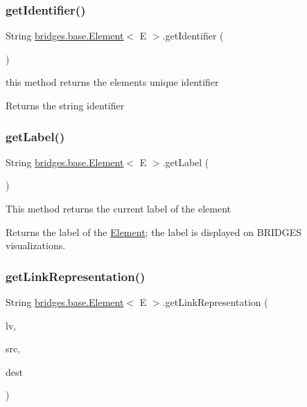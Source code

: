 \subsubsection{\texorpdfstring{getIdentifier()}{getIdentifier()}}
{\footnotesize\ttfamily String \mbox{\hyperlink{classbridges_1_1base_1_1_element}{bridges.\+base.\+Element}}$<$ E $>$.get\+Identifier (\begin{DoxyParamCaption}{ }\end{DoxyParamCaption})}

this method returns the element\textquotesingle{}s unique identifier

\begin{DoxyReturn}{Returns}
the string identifier 
\end{DoxyReturn}
\mbox{\label{classbridges_1_1base_1_1_element_a5c831a0238de487765f6021a887f1542}} 
\subsubsection{\texorpdfstring{getLabel()}{getLabel()}}
{\footnotesize\ttfamily String \mbox{\hyperlink{classbridges_1_1base_1_1_element}{bridges.\+base.\+Element}}$<$ E $>$.get\+Label (\begin{DoxyParamCaption}{ }\end{DoxyParamCaption})}

This method returns the current label of the element

\begin{DoxyReturn}{Returns}
the label of the \mbox{\hyperlink{classbridges_1_1base_1_1_element}{Element}}; the label is displayed on B\+R\+I\+D\+G\+ES visualizations. 
\end{DoxyReturn}
\mbox{\label{classbridges_1_1base_1_1_element_ae32deb37d1ad95d2fdfaa616062f319d}} 
\subsubsection{\texorpdfstring{getLinkRepresentation()}{getLinkRepresentation()}}
{\footnotesize\ttfamily String \mbox{\hyperlink{classbridges_1_1base_1_1_element}{bridges.\+base.\+Element}}$<$ E $>$.get\+Link\+Representation (\begin{DoxyParamCaption}\item[{\mbox{\hyperlink{classbridges_1_1base_1_1_link_visualizer}{Link\+Visualizer}}}]{lv,  }\item[{String}]{src,  }\item[{String}]{dest }\end{DoxyParamCaption})}

